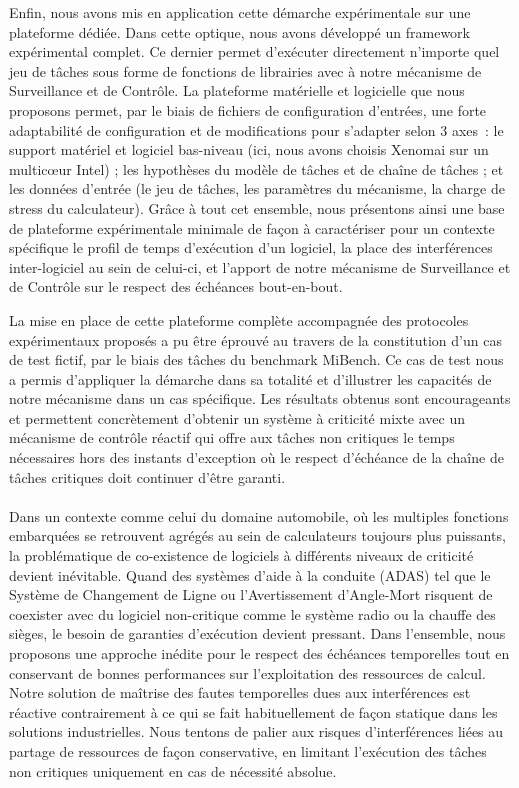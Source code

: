 \documentclass[a4paper,11pt,twoside]{StyleThese}
\begin{document}
Enfin, nous avons mis en application cette démarche expérimentale sur une plateforme dédiée. Dans cette optique, nous avons développé un framework expérimental complet. Ce dernier permet d'exécuter directement n'importe quel jeu de tâches sous forme de fonctions de librairies avec à notre mécanisme de Surveillance et de Contrôle. La plateforme matérielle et logicielle que nous proposons permet, par le biais de fichiers de configuration d'entrées, une forte adaptabilité de configuration et de modifications pour s'adapter selon 3 axes~: le support matériel et logiciel bas-niveau (ici, nous avons choisis Xenomai sur un multicœur Intel) ; les hypothèses du modèle de tâches et de chaîne de tâches ; et les données d'entrée (le jeu de tâches, les paramètres du mécanisme, la charge de stress du calculateur). Grâce à tout cet ensemble, nous présentons ainsi une base de plateforme expérimentale minimale de façon à caractériser pour un contexte spécifique le profil de temps d'exécution d'un logiciel, la place des interférences inter-logiciel au sein de celui-ci, et l'apport de notre mécanisme de Surveillance et de Contrôle sur le respect des échéances bout-en-bout. 

La mise en place de cette plateforme complète accompagnée des protocoles expérimentaux proposés a pu être éprouvé au travers de la constitution d'un cas de test fictif, par le biais des tâches du benchmark MiBench. Ce cas de test nous a permis d'appliquer la démarche dans sa totalité et d'illustrer les capacités de notre mécanisme dans un cas spécifique. Les résultats obtenus sont encourageants et permettent concrètement d'obtenir un système à criticité mixte avec un mécanisme de contrôle réactif qui offre aux tâches non critiques le temps nécessaires hors des instants d'exception où le respect d'échéance de la chaîne de tâches critiques doit continuer d'être garanti. 

\paragraph*{} Dans un contexte comme celui du domaine automobile, où les multiples fonctions embarquées se retrouvent agrégés au sein de calculateurs toujours plus puissants, la problématique de co-existence de logiciels à différents niveaux de criticité devient inévitable. Quand des systèmes d'aide à la conduite (ADAS) tel que le Système de Changement de Ligne ou l'Avertissement d'Angle-Mort risquent de coexister avec du logiciel non-critique comme le système radio ou la chauffe des sièges, le besoin de garanties d'exécution devient pressant. Dans l'ensemble, nous proposons une approche inédite pour le respect des échéances temporelles tout en conservant de bonnes performances sur l'exploitation des ressources de calcul. Notre solution de maîtrise des fautes temporelles dues aux interférences est réactive contrairement à ce qui se fait habituellement de façon statique dans les solutions industrielles. Nous tentons de palier aux risques d'interférences liées au partage de ressources de façon conservative, en limitant l'exécution des tâches non critiques uniquement en cas de nécessité absolue. 
\end{document}
